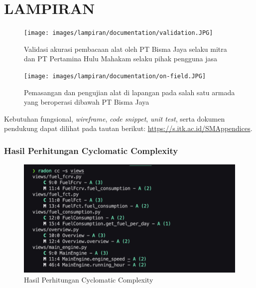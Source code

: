 \chapter*{LAMPIRAN}


\begin{figure}[!h]
    \texttt{[image: images/lampiran/documentation/validation.JPG]}
    \caption{Validasi akurasi pembacaan alat oleh PT Bisma Jaya selaku mitra dan PT Pertamina Hulu Mahakam selaku pihak pengguna jasa}
    \label{fig:doc-validation}
\end{figure}

\begin{figure}[!h]
    \texttt{[image: images/lampiran/documentation/on-field.JPG]}
    \caption{Pemasangan dan pengujian alat di lapangan pada salah satu armada yang beroperasi dibawah PT Bisma Jaya}
    \label{fig:doc-lapangan}
\end{figure}

 \label{apdx:hasil}

Kebutuhan fungsional, \textit{wireframe}, \textit{code snippet}, \textit{unit test}, serta dokumen pendukung dapat dilihat pada tautan berikut: \url{https://s.itk.ac.id/SMAppendices}.

\subsection{Hasil Perhitungan Cyclomatic Complexity}\label{apdx:hasil-cc}

\begin{figure}[!h]
    \includegraphics[width=1\linewidth, center]{images/hasil/cc-result.png}
    \caption{Hasil Perhitungan Cyclomatic Complexity}
    \label{fig:cc-result}
\end{figure}


